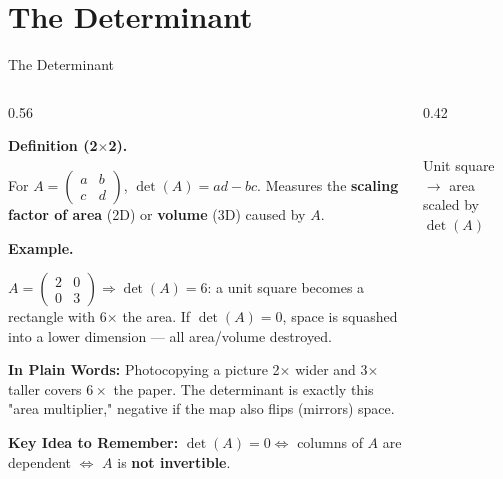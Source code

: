 \documentclass[9pt,aspectratio=169]{beamer}
\newcommand{\keyidea}[1]{%
\par\medskip\noindent\textbf{Key Idea to Remember:} #1\par\medskip}
\newcommand{\childex}[1]{%
\par\medskip\noindent\textbf{In Plain Words:} #1\par\medskip}
\begin{document}
\section{The Determinant}

\begin{frame}{The Determinant}
\footnotesize
\begin{columns}[T]
\begin{column}{0.56\textwidth}
\par\noindent\textbf{Definition (2$\times$2).}\par
For $A = \begin{pmatrix} a&b\\c&d\end{pmatrix}$, $\det(A) = ad-bc$.
Measures the \textbf{scaling factor of area} (2D) or \textbf{volume} (3D) caused by $A$.
\medskip

\par\noindent\textbf{Example.}\par
$A = \begin{pmatrix} 2&0\\0&3\end{pmatrix} \Rightarrow \det(A) = 6$: a unit square becomes
a rectangle with 6$\times$ the area. If $\det(A)=0$, space is squashed into a lower
dimension --- all area/volume destroyed.
\medskip

\childex{Photocopying a picture 2$\times$ wider and 3$\times$ taller covers $6\times$ the
paper. The determinant is exactly this "area multiplier," negative if the map also flips
(mirrors) space.}

\keyidea{$\det(A)=0 \iff$ columns of $A$ are dependent $\iff$ $A$ is \textbf{not
invertible}.}
\end{column}
\begin{column}{0.42\textwidth}
\centering
{}
\\[0.3em]{\scriptsize Unit square $\to$ area scaled by $\det(A)$}
\end{column}
\end{columns}
\end{frame}
\end{document}

